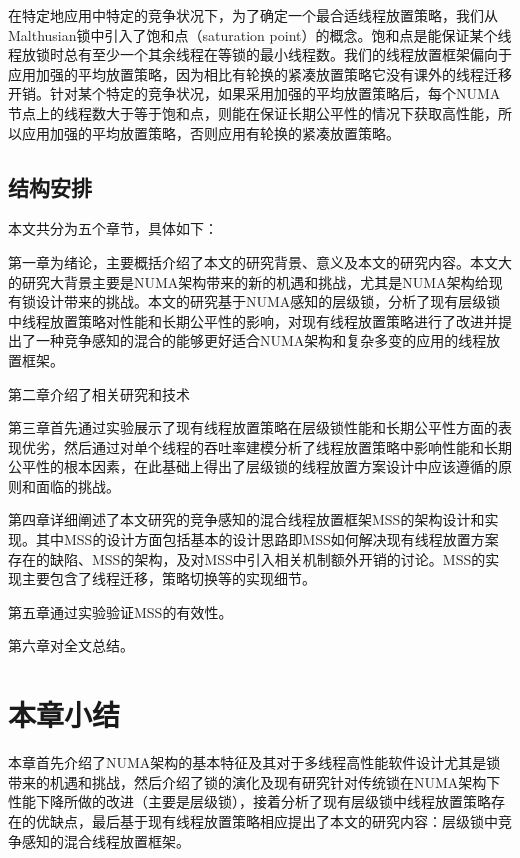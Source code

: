 在特定地应用中特定的竞争状况下，为了确定一个最合适线程放置策略，我们从Malthusian锁中引入了饱和点（saturation point）的概念。饱和点是能保证某个线程放锁时总有至少一个其余线程在等锁的最小线程数。我们的线程放置框架偏向于应用加强的平均放置策略，因为相比有轮换的紧凑放置策略它没有课外的线程迁移开销。针对某个特定的竞争状况，如果采用加强的平均放置策略后，每个NUMA节点上的线程数大于等于饱和点，则能在保证长期公平性的情况下获取高性能，所以应用加强的平均放置策略，否则应用有轮换的紧凑放置策略。
\subsection{结构安排}
本文共分为五个章节，具体如下：

第一章为绪论，主要概括介绍了本文的研究背景、意义及本文的研究内容。本文大的研究大背景主要是NUMA架构带来的新的机遇和挑战，尤其是NUMA架构给现有锁设计带来的挑战。本文的研究基于NUMA感知的层级锁，分析了现有层级锁中线程放置策略对性能和长期公平性的影响，对现有线程放置策略进行了改进并提出了一种竞争感知的混合的能够更好适合NUMA架构和复杂多变的应用的线程放置框架。

第二章介绍了相关研究和技术

第三章首先通过实验展示了现有线程放置策略在层级锁性能和长期公平性方面的表现优劣，然后通过对单个线程的吞吐率建模分析了线程放置策略中影响性能和长期公平性的根本因素，在此基础上得出了层级锁的线程放置方案设计中应该遵循的原则和面临的挑战。

第四章详细阐述了本文研究的竞争感知的混合线程放置框架MSS的架构设计和实现。其中MSS的设计方面包括基本的设计思路即MSS如何解决现有线程放置方案存在的缺陷、MSS的架构，及对MSS中引入相关机制额外开销的讨论。MSS的实现主要包含了线程迁移，策略切换等的实现细节。

第五章通过实验验证MSS的有效性。

第六章对全文总结。
\section{本章小结}
本章首先介绍了NUMA架构的基本特征及其对于多线程高性能软件设计尤其是锁带来的机遇和挑战，然后介绍了锁的演化及现有研究针对传统锁在NUMA架构下性能下降所做的改进（主要是层级锁），接着分析了现有层级锁中线程放置策略存在的优缺点，最后基于现有线程放置策略相应提出了本文的研究内容：层级锁中竞争感知的混合线程放置框架。